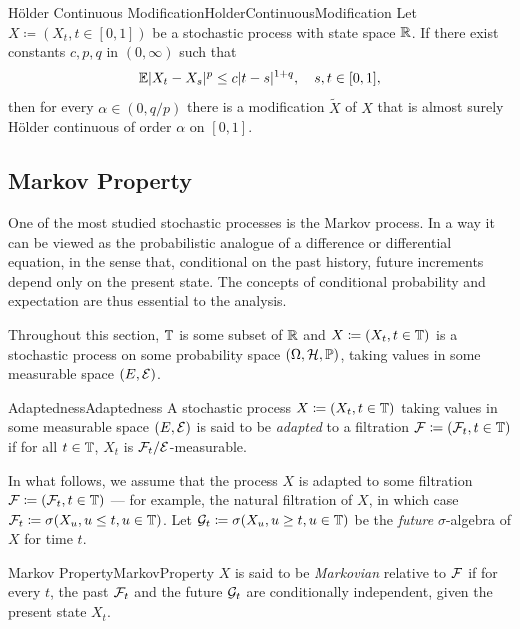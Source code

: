 \begin{thm}{Hölder Continuous Modification}{HolderContinuousModification}
    Let \(X \coloneqq (X_t, t \in [0, 1])\) be a stochastic process with state space \(\mathbb{R}\). If there exist constants \(c, p, q\) in \((0, \infty)\) such that
    \begin{equation}\label{eq:KolmogorovChentsovCondition}
        \mathbb{E}|X_t - X_s|^p \leq c |t - s|^{1+q}, \quad s, t \in [0, 1],
    \end{equation}
    then for every \(\alpha \in (0, q/p)\) there is a modification \(\widetilde{X}\) of \(X\) that is almost surely Hölder continuous of order \(\alpha\) on \([0, 1]\).
\end{thm}

\subsection{Markov Property}
One of the most studied stochastic processes is the Markov process. In a way it can be viewed as the probabilistic analogue of a difference or differential equation, in the sense that, conditional on the past history, future increments depend only on the present state. The concepts of conditional probability and expectation are thus essential to the analysis.

Throughout this section, \(\mathbb{T}\) is some subset of \(\mathbb{R}\) and \(X \coloneqq (X_t, t \in \mathbb{T})\) is a stochastic process on some probability space \((\Omega, \mathcal{H}, \mathbb{P})\), taking values in some measurable space \((E, \mathcal{E})\).

\begin{defn}{Adaptedness}{Adaptedness}
    A stochastic process \(X \coloneqq (X_t, t \in \mathbb{T})\) taking values in some measurable space \((E, \mathcal{E})\) is said to be \emph{adapted} to a filtration \(\mathcal{F} \coloneqq (\mathcal{F}_t, t \in \mathbb{T})\) if for all \(t \in \mathbb{T}\), \(X_t\) is \(\mathcal{F}_t/\mathcal{E}\)-measurable.
\end{defn}

In what follows, we assume that the process \(X\) is adapted to some filtration \(\mathcal{F} \coloneqq (\mathcal{F}_t, t \in \mathbb{T})\) --- for example, the natural filtration of \(X\), in which case \(\mathcal{F}_t \coloneqq \sigma(X_u, u \leq t, u \in \mathbb{T})\). Let \(\mathcal{G}_t \coloneqq \sigma(X_u, u \geq t, u \in \mathbb{T})\) be the \textit{future} \(\sigma\)-algebra of \(X\) for time \(t\).

\begin{defn}{Markov Property}{MarkovProperty}
    \(X\) is said to be \emph{Markovian} relative to \(\mathcal{F}\) if for every \(t\), the past \(\mathcal{F}_t\) and the future \(\mathcal{G}_t\) are conditionally independent, given the present state \(X_t\).
\end{defn}

